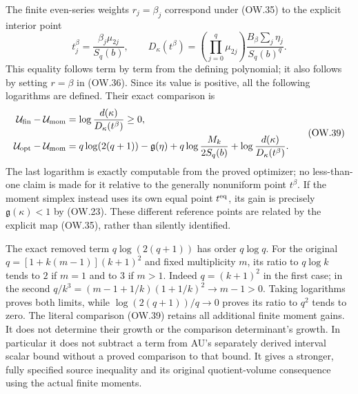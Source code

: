 \documentclass[11pt]{article}
\begin{document}
The finite even-series weights $r_j=\beta_j$ correspond under (OW.35)
to the explicit interior point
\[
 t_j^\beta=\frac{\beta_j\mu_{2j}}{S_q(b)},\qquad
 D_\kappa(t^\beta)=
   \left(\prod_{j=0}^q\mu_{2j}\right)
       \frac{B_\beta\sum_j\eta_j}{S_q(b)^q}.
 \tag{OW.38}
\]
This equality follows term by term from the defining polynomial; it
also follows by setting $r=\beta$ in (OW.36). Since its value is positive,
all the following logarithms are defined. Their exact comparison is
\[
 \begin{split}
 \mathcal U_{\rm fin}-\mathcal U_{\rm mom}
    &=\log\frac{d(\kappa)}{D_\kappa(t^\beta)}\ge0,\\
 \mathcal U_{\rm opt}-\mathcal U_{\rm mom}
    &=q\log(2(q+1))-\mathfrak g(\eta)
       +q\log\frac{M_k}{2S_q(b)}
       +\log\frac{d(\kappa)}{D_\kappa(t^\beta)}.
 \end{split}                                                  \tag{OW.39}
\]
The last logarithm is exactly computable from the proved optimizer;
no less-than-one claim is made for it relative to the generally
nonuniform point $t^\beta$. If the moment simplex instead uses its
own equal point $t^{\rm eq}$, its gain is precisely
$\mathfrak g(\kappa)<1$ by (OW.23). These different reference points
are related by the explicit map (OW.35), rather than silently identified.

The exact removed term $q\log(2(q+1))$ has order $q\log q$.
For the original $q=[1+k(m-1)](k+1)^2$ and fixed multiplicity $m$,
its ratio to $q\log k$ tends to $2$ if $m=1$ and to $3$ if $m>1$.
Indeed $q=(k+1)^2$ in the first case; in the second
$q/k^3=(m-1+1/k)(1+1/k)^2\to m-1>0$.
Taking logarithms proves both limits, while
$\log(2(q+1))/q\to0$ proves its ratio to $q^2$ tends to zero.
The literal comparison (OW.39) retains all additional finite moment
gains. It does not determine their growth or the comparison determinant's
growth. In particular it does not subtract a term from AU's separately
derived interval scalar bound without a proved comparison to that bound.
It gives a stronger, fully specified source inequality and its original
quotient-volume consequence using the actual finite moments.
\end{document}
